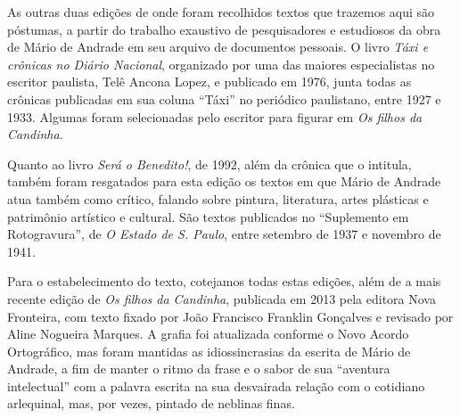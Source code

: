 As outras duas edições de onde foram recolhidos textos que trazemos aqui
são póstumas, a partir do trabalho exaustivo de pesquisadores e
estudiosos da obra de Mário de Andrade em seu arquivo de documentos
pessoais. O livro \emph{Táxi e crônicas no Diário Nacional}, organizado
por uma das maiores especialistas no escritor paulista, Telê Ancona
Lopez, e publicado em 1976, junta todas as crônicas publicadas em sua
coluna ``Táxi'' no periódico paulistano, entre 1927 e 1933. Algumas
foram selecionadas pelo escritor para figurar em \emph{Os filhos da
Candinha}.

Quanto ao livro \emph{Será o Benedito!}, de 1992, além da crônica que o
intitula, também foram resgatados para esta edição os textos em que
Mário de Andrade atua também como crítico, falando sobre pintura,
literatura, artes plásticas e patrimônio artístico e cultural. São
textos publicados no ``Suplemento em Rotogravura'', de \emph{O Estado de
S. Paulo}, entre setembro de 1937 e novembro de 1941.

Para o estabelecimento do texto, cotejamos todas estas edições, além de
a mais recente edição de \emph{Os filhos da Candinha}, publicada em 2013
pela editora Nova Fronteira, com texto fixado por João Francisco
Franklin Gonçalves e revisado por Aline Nogueira Marques. A grafia foi
atualizada conforme o Novo Acordo Ortográfico, mas foram mantidas as
idiossincrasias da escrita de Mário de Andrade, a fim de manter o ritmo
da frase e o sabor de sua ``aventura intelectual'' com a palavra escrita
na sua desvairada relação com o cotidiano arlequinal, mas, por vezes,
pintado de neblinas finas.